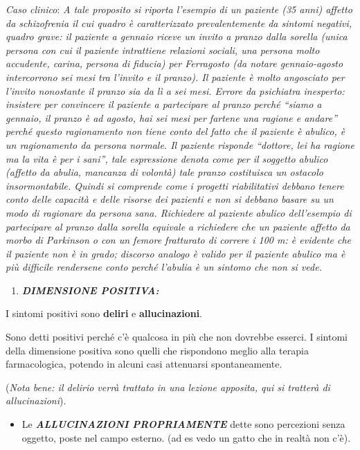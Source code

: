 \documentclass[]{article}
\begin{document}
\emph{Caso clinico}: \emph{A tale proposito si riporta l'esempio di un
paziente (35 anni) affetto da schizofrenia il cui quadro è
caratterizzato prevalentemente da sintomi negativi, quadro grave: il
paziente a gennaio riceve un invito a pranzo dalla sorella (unica
persona con cui il paziente intrattiene relazioni sociali, una persona
molto accudente, carina, persona di fiducia) per Ferragosto (da notare
gennaio-agosto intercorrono sei mesi tra l'invito e il pranzo). Il
paziente è molto angosciato per l'invito nonostante il pranzo sia da lì
a sei mesi. Errore da psichiatra inesperto: insistere per convincere il
paziente a partecipare al pranzo perché ``siamo a gennaio, il pranzo è
ad agosto, hai sei mesi per fartene una ragione e andare'' perché questo
ragionamento non tiene conto del fatto che il paziente è abulico, è un
ragionamento da persona normale. Il paziente risponde ``dottore, lei ha
ragione ma la vita è per i sani'', tale espressione denota come per il
soggetto abulico (affetto da abulia, mancanza di volontà) tale pranzo
costituisca un ostacolo insormontabile. Quindi si comprende come i
progetti riabilitativi debbano tenere conto delle capacità e delle
risorse dei pazienti e non si debbano basare su un modo di ragionare da
persona sana. Richiedere al paziente abulico dell'esempio di partecipare
al pranzo dalla sorella equivale a richiedere che un paziente affetto da
morbo di Parkinson o con un femore fratturato di correre i 100 m: è
evidente che il paziente non è in grado; discorso analogo è valido per
il paziente abulico ma è più difficile rendersene conto perché l'abulia
è un sintomo che non si vede. }

\begin{enumerate}
\def\labelenumi{\arabic{enumi}.}
\item
  \textbf{\emph{DIMENSIONE POSITIVA:}}
\end{enumerate}

I sintomi positivi sono \textbf{deliri} e \textbf{allucinazioni}.

Sono detti positivi perché c'è qualcosa in più che non dovrebbe esserci.
I sintomi della dimensione positiva sono quelli che rispondono meglio
alla terapia farmacologica, potendo in alcuni casi attenuarsi
spontaneamente.

(\emph{Nota bene: il delirio verrà trattato in una lezione apposita, qui
si tratterà di allucinazioni}).

\begin{itemize}
\item
  Le \textbf{\emph{ALLUCINAZIONI PROPRIAMENTE}} dette sono percezioni
  senza oggetto, poste nel campo esterno. (ad es vedo un gatto che in
  realtà non c'è).
\end{itemize}
\end{document}
